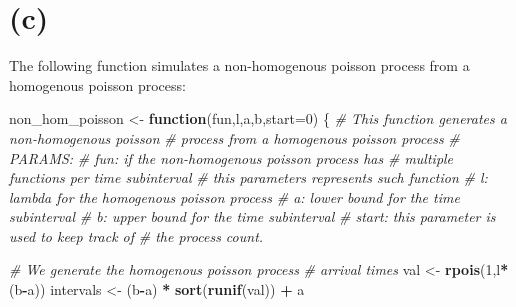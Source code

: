 \documentclass[]{article}
\newenvironment{Shaded}{\begin{snugshade}}{\end{snugshade}}
\newcommand{\CommentTok}[1]{\textcolor[rgb]{0.56,0.35,0.01}{\textit{#1}}}
\newcommand{\ControlFlowTok}[1]{\textcolor[rgb]{0.13,0.29,0.53}{\textbf{#1}}}
\newcommand{\DataTypeTok}[1]{\textcolor[rgb]{0.13,0.29,0.53}{#1}}
\newcommand{\DecValTok}[1]{\textcolor[rgb]{0.00,0.00,0.81}{#1}}
\newcommand{\KeywordTok}[1]{\textcolor[rgb]{0.13,0.29,0.53}{\textbf{#1}}}
\newcommand{\NormalTok}[1]{#1}
\newcommand{\OperatorTok}[1]{\textcolor[rgb]{0.81,0.36,0.00}{\textbf{#1}}}
\newcommand{\StringTok}[1]{\textcolor[rgb]{0.31,0.60,0.02}{#1}}
\begin{document}
\newpage

\hypertarget{c}{%
\section{(c)}\label{c}}

The following function simulates a non-homogenous poisson process from a
homogenous poisson process:

\begin{Shaded}
\begin{Highlighting}[]
\NormalTok{non_hom_poisson <-}\StringTok{ }\ControlFlowTok{function}\NormalTok{(fun,l,a,b,}\DataTypeTok{start=}\DecValTok{0}\NormalTok{) \{}
    \CommentTok{# This function generates a non-homogenous poisson }
    \CommentTok{# process from a homogenous poisson process}
    \CommentTok{# PARAMS:}
    \CommentTok{# fun:   if the non-homogenous poisson process has}
    \CommentTok{#        multiple functions per time subinterval}
    \CommentTok{#        this parameters represents such function}
    \CommentTok{# l:     lambda for the homogenous poisson process}
    \CommentTok{# a:     lower bound for the time subinterval}
    \CommentTok{# b:     upper bound for the time subinterval}
    \CommentTok{# start: this parameter is used to keep track of }
    \CommentTok{#        the process count.}
    
    \CommentTok{# We generate the homogenous poisson process }
    \CommentTok{# arrival times}
\NormalTok{    val <-}\StringTok{ }\KeywordTok{rpois}\NormalTok{(}\DecValTok{1}\NormalTok{,l}\OperatorTok{*}\NormalTok{(b}\OperatorTok{-}\NormalTok{a))}
\NormalTok{    intervals <-}\StringTok{ }\NormalTok{(b}\OperatorTok{-}\NormalTok{a) }\OperatorTok{*}\StringTok{ }\KeywordTok{sort}\NormalTok{(}\KeywordTok{runif}\NormalTok{(val)) }\OperatorTok{+}\StringTok{ }\NormalTok{a}


\end{Highlighting}
\end{Shaded}
\end{document}
